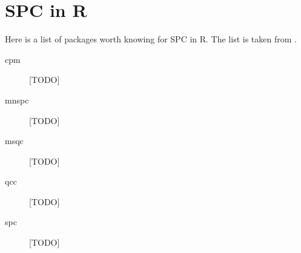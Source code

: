 


\chapter{SPC in R}
\label{apx:r}

Here is a list of packages worth knowing for SPC in R.
The list is taken from \cite{qiu_introduction_2013}. 

\begin{description}
\item [cpm] [TODO]
\item [mnspc] [TODO]
\item [msqc] [TODO]
\item [qcc] [TODO]
\item [spc] [TODO]
\end{description}

